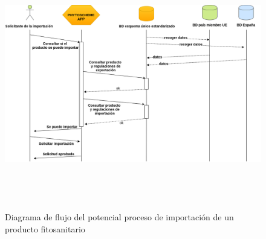 \begin{figure}[H]
    \centering
    \includegraphics[width=1\textwidth,height=11cm]{Imagenes/Diagrama_de_flujo_proceso_potencial_de_importacion_producto_fitosanitario}
    \caption{Diagrama de flujo del potencial  proceso de importación de un producto fitosanitario}
    \label{fig:flujo_potencial_importacion}
\end{figure}
\par

